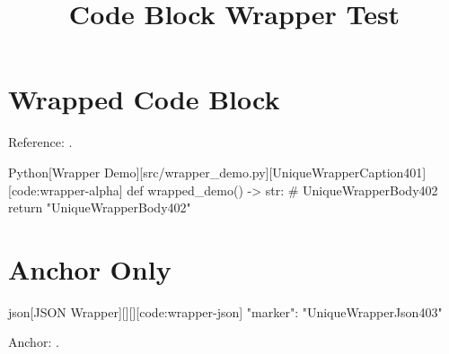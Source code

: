 \documentclass[code=listings]{SUSTechHomework}
\title{Code Block Wrapper Test}
\begin{document}
\maketitle

\section{Wrapped Code Block}

Reference: .

\begin{sustechcodeblock}{Python}[Wrapper Demo][src/wrapper_demo.py][UniqueWrapperCaption401][code:wrapper-alpha]
def wrapped_demo() -> str:
    # UniqueWrapperBody402
    return "UniqueWrapperBody402"
\end{sustechcodeblock}

\section{Anchor Only}

\begin{sustechcodeblock}{json}[JSON Wrapper][][][code:wrapper-json]
{
  "marker": "UniqueWrapperJson403"
}
\end{sustechcodeblock}

Anchor: .
\end{document}
